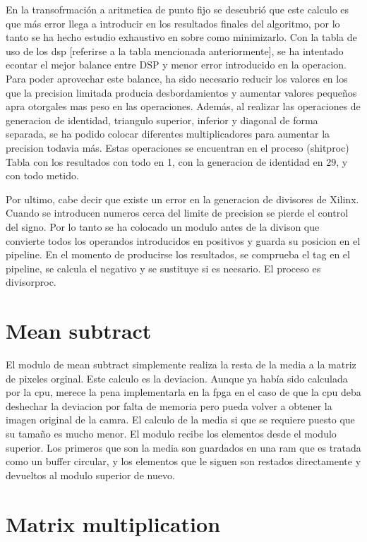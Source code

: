 En la transofrmación a aritmetica de punto fijo se descubrió que este calculo es que más error llega a introducir en los resultados finales del algoritmo, por lo tanto se ha hecho estudio exhaustivo en  sobre como minimizarlo. Con la tabla de uso de los dsp [referirse a la tabla mencionada anteriormente], se ha intentado econtar el mejor balance entre DSP y menor error introducido en la operacion.
Para poder aprovechar este balance, ha sido necesario reducir los valores en los que la precision limitada producia desbordamientos y aumentar valores pequeños apra otorgales mas peso en las operaciones. Además, al realizar las operaciones de generacion de identidad, triangulo superior, inferior y diagonal de forma separada, se ha podido colocar diferentes multiplicadores para aumentar la precision todavia más. Estas operaciones se encuentran en el proceso (shitproc)
Tabla con los resultados con todo en 1, con la generacion de identidad en 29, y con todo metido. 

Por ultimo, cabe decir que existe un error en la generacion de divisores de Xilinx. Cuando se introducen numeros cerca del limite de precision se pierde el control del signo. Por lo tanto se ha colocado un modulo antes de la divison que convierte todos los operandos introducidos en positivos y guarda su posicion en el pipeline. En el momento de producirse los resultados, se comprueba el tag en el pipeline, se calcula el negativo y se sustituye si es neesario. El proceso es divisorproc.

\section{Mean subtract}
El modulo de mean subtract simplemente realiza la resta de la media a la matriz de pixeles orginal. Este calculo es la deviacion. Aunque ya había sido calculada por la cpu, merece la pena implementarla en la fpga en el caso de que la cpu deba deshechar la deviacion por falta de memoria pero pueda volver a obtener la imagen original de la camra. El calculo de la media si que se requiere puesto que su tamaño es mucho menor.
El modulo recibe los elementos desde el modulo superior. Los primeros que son la media son guardados en una ram que es tratada como un buffer circular, y los elementos que le siguen son restados directamente y devueltos al modulo superior de nuevo.


\section{Matrix multiplication}


